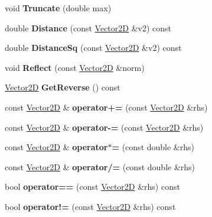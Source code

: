 \begin{DoxyCompactItemize}
\mbox{\label{structVector2D_a005fda83f3daaf3458d68ec177caedfd}} 
void {\bfseries Truncate} (double max)
\item 
\mbox{\label{structVector2D_a7e637c70522b98cabe95f88276238e46}} 
double {\bfseries Distance} (const \mbox{\hyperlink{structVector2D}{Vector2D}} \&v2) const
\item 
\mbox{\label{structVector2D_a24f4bf1e423224a2d23840eecbdf34cd}} 
double {\bfseries Distance\+Sq} (const \mbox{\hyperlink{structVector2D}{Vector2D}} \&v2) const
\item 
\mbox{\label{structVector2D_a7cef865849390244f0e6f3dde552d27d}} 
void {\bfseries Reflect} (const \mbox{\hyperlink{structVector2D}{Vector2D}} \&norm)
\item 
\mbox{\label{structVector2D_a26e417c30dcd5b7df9d0d909fdae97e4}} 
\mbox{\hyperlink{structVector2D}{Vector2D}} {\bfseries Get\+Reverse} () const
\item 
\mbox{\label{structVector2D_aad76999952386d0e849237724e1c3781}} 
const \mbox{\hyperlink{structVector2D}{Vector2D}} \& {\bfseries operator+=} (const \mbox{\hyperlink{structVector2D}{Vector2D}} \&rhs)
\item 
\mbox{\label{structVector2D_a9ca1113d9f97c9f98fa08253ed164196}} 
const \mbox{\hyperlink{structVector2D}{Vector2D}} \& {\bfseries operator-\/=} (const \mbox{\hyperlink{structVector2D}{Vector2D}} \&rhs)
\item 
\mbox{\label{structVector2D_a8c932cad899a6a37ddc3ca2791048805}} 
const \mbox{\hyperlink{structVector2D}{Vector2D}} \& {\bfseries operator$\ast$=} (const double \&rhs)
\item 
\mbox{\label{structVector2D_ab092ca70a0c357a48a0f0640317ae192}} 
const \mbox{\hyperlink{structVector2D}{Vector2D}} \& {\bfseries operator/=} (const double \&rhs)
\item 
\mbox{\label{structVector2D_a41f425fcd08fb82c7e72e132fb51136f}} 
bool {\bfseries operator==} (const \mbox{\hyperlink{structVector2D}{Vector2D}} \&rhs) const
\item 
\mbox{\label{structVector2D_a636dc6a83bf15792bd079c0c2958503f}} 
bool {\bfseries operator!=} (const \mbox{\hyperlink{structVector2D}{Vector2D}} \&rhs) const
\end{DoxyCompactItemize}
